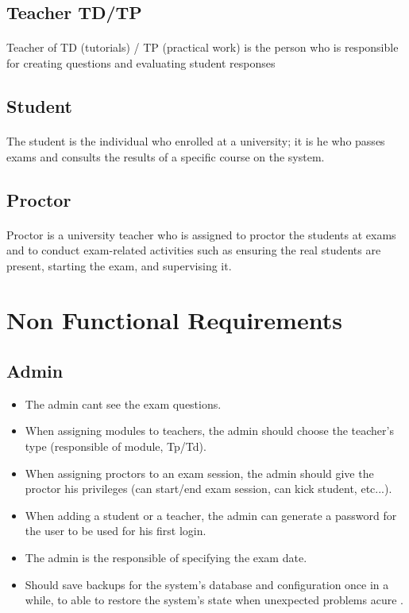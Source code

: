\documentclass[]{uc2pfecaneva}
\begin{document}
\subsection{Teacher TD/TP}
\justifying\paragraph{}
	Teacher of TD (tutorials) / TP (practical work) is the person who is responsible for creating questions and evaluating student responses


\subsection{Student}
\justifying\paragraph{}
	The student is the individual who enrolled at a university; it is he who passes exams and consults the results of a specific course on the system.

\subsection{Proctor}
\justifying\paragraph{}
	Proctor is a university teacher who is assigned to proctor the students at exams and to conduct exam-related activities such as ensuring the real students are present, starting the exam, and supervising it.

\section{Non Functional Requirements}
\subsection{Admin}
\begin{itemize}
\item The admin cant see the exam questions.
\item When assigning modules to teachers, the admin should choose the teacher’s type (responsible of module, Tp/Td).
\item When assigning proctors to an exam session, the admin should give the proctor his privileges (can start/end exam session, can kick student, etc...).
\item When adding a student or a teacher, the admin can generate a password for the user to be used for his first login.
\item The admin is the responsible of specifying the exam date.
\item Should save backups for the system’s database and configuration once in a while, to able to restore the system’s state when  unexpected problems acure .

\end{itemize}
\end{document}
